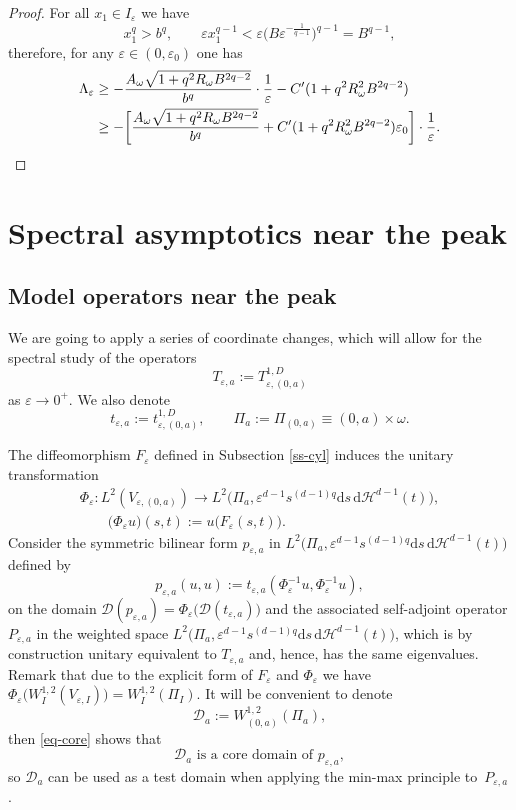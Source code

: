 \documentclass[11pt,oneside,reqno,a4paper]{amsart}
\newcommand{\dd}{\mathrm{d}}
\newcommand{\cD}{\mathcal{D}}
\renewcommand{\H}{\mathcal{H}}
\newcommand{\eps}{\varepsilon}
\theoremstyle{definition}
\begin{document}
\begin{proof}
For all $x_1\in I_\eps$ we have
\[
 x_1^q>b^q,\qquad
\eps x_1^{q-1}< \eps \big(B \eps^{-\frac{1}{q-1}}\big)^{q-1}=B^{q-1},
\]
therefore, for any $\eps\in(0,\eps_0)$ one has
\begin{align*}
\Lambda_\eps &
\ge -\dfrac{A_\omega\sqrt{1+q^2R_\omega B^{2q-2}}}{b^q}\cdot\dfrac{1}{\eps}-C'(1+q^2R_\omega^2 B^{2q-2})\\
&\ge -\bigg[ \dfrac{A_\omega\sqrt{1+q^2R_\omega B^{2q-2}}}{b^q} + C'(1+q^2R_\omega^2 B^{2q-2}) \eps_0\bigg]\cdot\dfrac{1}{\eps}. \qedhere
\end{align*}
\end{proof}	





\section{Spectral asymptotics near the peak}\label{peak}


\subsection{Model operators near the peak}
We are going to apply a series of coordinate changes, which will allow for the spectral study of the operators
\begin{equation}
	\label{tea}
T_{\eps,a}:=T^{1,D}_{\eps,(0,a)}
\end{equation}
as $\eps\to 0^+$. We also denote
\[
t_{\eps,a}:=t^{1,D}_{\eps,(0,a)}, \qquad \Pi_a:=\Pi_{(0,a)}\equiv (0,a)\times\omega.
\]

The diffeomorphism $F_\eps$ defined in Subsection \ref{ss-cyl} induces the unitary transformation
\begin{gather*}
	\Phi_\eps:L^2(V_{\eps,(0,a)})\to L^2\big(\Pi_a,\eps^{d-1}s^{(d-1)q}\dd s \,\dd\H^{d-1}(t)\big),\\
	\qquad  \big(\Phi_\eps u\big)(s,t):=u\big(F_\eps(s,t)\big). 
\end{gather*}
Consider the symmetric bilinear form $p_{\eps,a}$ in $L^2\big(\Pi_a,\eps^{d-1}s^{(d-1)q}\dd s \,\dd\H^{d-1}(t)\big)$ defined by
\[
p_{\eps,a}(u,u):=t_{\eps,a}(\Phi_\eps^{-1} u,\Phi_\eps^{-1} u),
\]
on the domain $\cD(p_{\eps,a})=\Phi_\eps\big(\cD(t_{\eps,a})\big)$
and the associated self-adjoint operator $P_{\eps,a}$ in the weighted space $L^2\big(\Pi_a,\eps^{d-1}s^{(d-1)q}\dd s \,\dd\H^{d-1}(t)\big)$, which is by construction unitary
equivalent to $T_{\eps,a}$ and, hence, has the same eigenvalues.
Remark that due to the explicit form of $F_\eps$ and $\Phi_\eps$ we have
$\Phi_\eps\big(W^{1,2}_I(V_{\eps,I})\big)=W^{1,2}_I(\Pi_I)$.
It will be convenient to denote
\[
\cD_a:=W^{1,2}_{(0,a)}(\Pi_a),
\]
then \eqref{eq-core} shows that
\begin{equation*}
	\cD_a\text{ is a core domain of }p_{\eps,a},
	\label{eq-core2}
\end{equation*}
so $\cD_a$ can be used as a test domain when applying the min-max principle to~$P_{\eps,a}$. 
\end{document}
